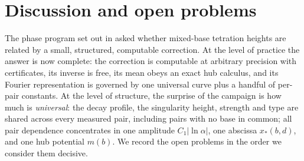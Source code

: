 \documentclass[11pt,a4paper]{article}
\theoremstyle{definition}
\theoremstyle{remark}
\begin{document}
\section{Discussion and open problems}\label{sec:discussion}

The phase program set out in \cite{phaselaw} asked whether mixed-base tetration heights are
related by a small, structured, computable correction. At the level of practice the answer
is now complete: the correction is computable at arbitrary precision with certificates, its
inverse is free, its mean obeys an exact hub calculus, and its Fourier representation is
governed by one universal curve plus a handful of per-pair constants. At the level of
structure, the surprise of the campaign is how much is \emph{universal}: the decay profile,
the singularity height, strength and type are shared across every measured pair, including
pairs with no base in common; all pair dependence concentrates in one amplitude
$C_1\lvert\ln\alpha\rvert$, one abscissa $x_*(b,d)$, and one hub potential $m(b)$. We record
the open problems in the order we consider them decisive.
\end{document}
